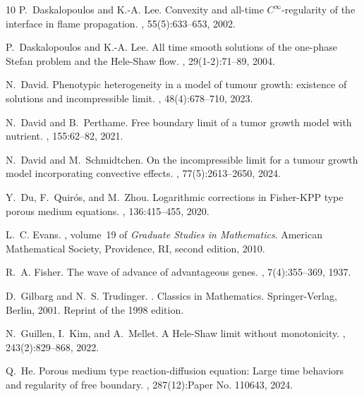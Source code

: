 \documentclass[10pt]{article}         %
\numberwithin{equation}{section}
\begin{document}
\begin{thebibliography}{10}
P.~Daskalopoulos and K.-A. Lee.
\newblock Convexity and all-time {$C^\infty$}-regularity of the interface in
  flame propagation.
, 55(5):633--653, 2002.

P.~Daskalopoulos and K.-A. Lee.
\newblock All time smooth solutions of the one-phase {S}tefan problem and the
  {H}ele-{S}haw flow.
, 29(1-2):71--89, 2004.

N.~David.
\newblock Phenotypic heterogeneity in a model of tumour growth: existence of
  solutions and incompressible limit.
, 48(4):678--710, 2023.

N.~David and B.~Perthame.
\newblock Free boundary limit of a tumor growth model with nutrient.
, 155:62--82, 2021.

N.~David and M.~Schmidtchen.
\newblock On the incompressible limit for a tumour growth model incorporating
  convective effects.
, 77(5):2613--2650, 2024.

Y.~Du, F.~Quir\'{o}s, and M.~Zhou.
\newblock Logarithmic corrections in {F}isher-{KPP} type porous medium
  equations.
, 136:415--455, 2020.

L.~C. Evans.
, volume~19 of {\em Graduate
  Studies in Mathematics}.
\newblock American Mathematical Society, Providence, RI, second edition, 2010.

R.~A. Fisher.
\newblock The wave of advance of advantageous genes.
, 7(4):355--369, 1937.

D.~Gilbarg and N.~S. Trudinger.
.
\newblock Classics in Mathematics. Springer-Verlag, Berlin, 2001.
\newblock Reprint of the 1998 edition.

N.~Guillen, I.~Kim, and A.~Mellet.
\newblock A {H}ele-{S}haw limit without monotonicity.
, 243(2):829--868, 2022.

Q.~He.
\newblock Porous medium type reaction-diffusion equation: {L}arge time
  behaviors and regularity of free boundary.
, 287(12):Paper No. 110643, 2024.


\end{thebibliography}
\end{document}
